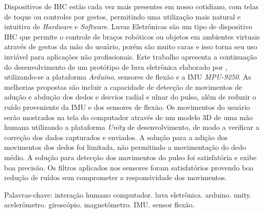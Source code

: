 \begin{resumo}
\vspace{-1cm}

\onehalfspacing
\noindent 
Dispositivos de \ac{IHC} estão cada vez mais presentes em nosso cotidiano, com telas de toque ou controles por gestos, permitindo uma utilização mais natural e intuitiva de \textit{Hardware} e \textit{Software}. Luvas Eletrônicas são um tipo de dispositivo \ac{IHC} que permite o controle de braços robóticos ou objetos em ambientes virtuais através de gestos da mão do usuário, porém são muito caras e isso torna seu uso inviável para aplicações não profissionais. Este trabalho apresenta a continuação do desenvolvimento de um protótipo de luva eletrônica elaborado por , utilizando-se a plataforma \textit{Arduino}, sensores de flexão e a \ac{IMU} \textit{MPU-9250}. As melhorias propostas são incluir a capacidade de detecção de movimentos de adução e abdução dos dedos e desvios radial e ulnar do pulso, além de reduzir o ruído proveniente da \ac{IMU} e dos sensores de flexão. Os movimentos do usuário serão mostrados na tela do computador através de um modelo \ac{3D} de uma mão humana utilizando a plataforma \textit{Unity} de desenvolvimento, de modo a verificar a correção dos dados capturados e enviados. A solução para a adição dos movimentos dos dedos foi limitada, não permitindo a movimentação do dedo médio. A solução para detecção dos movimentos do pulso foi satisfatória e exibe boa precisão. Os filtros aplicados nos sensores foram satisfatórios provendo boa redução de ruídos sem comprometer a responsividade dos movimentos.

\vspace*{.75cm}

\noindent Palavras-chave: interação humano computador. luva eletrônica. arduino. unity. acelerômetro. giroscópio. magnetômetro. IMU. sensor flexão.\\

\end{resumo}